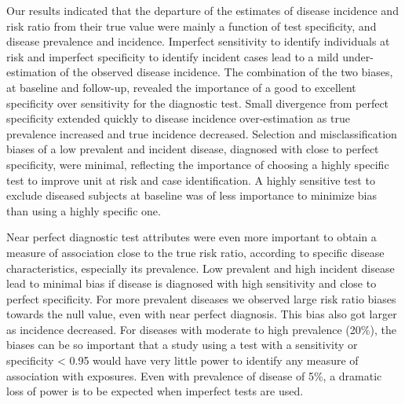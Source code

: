 Our results indicated that the departure of the estimates of disease incidence
and risk ratio from their true value were mainly a function of test specificity,
and disease prevalence and incidence.
Imperfect sensitivity to identify individuals at risk and imperfect
specificity to identify incident cases lead to a mild under-estimation of the
observed disease incidence.
The combination of the two biases, at baseline and follow-up, revealed the
importance of a good to excellent specificity over sensitivity for the
diagnostic test.
Small divergence from perfect specificity extended quickly to disease
incidence over-estimation as true prevalence increased and true incidence
decreased.
Selection and misclassification biases of a low prevalent and incident
disease, diagnosed with close to perfect specificity, were minimal, reflecting
the importance of choosing a highly specific test to improve unit at risk and
case identification.
A highly sensitive test to exclude diseased subjects at baseline was of less
importance to minimize bias than using a highly specific one.

Near perfect diagnostic test attributes were even more important to obtain a
measure of association close to the true risk ratio, according to specific
disease characteristics, especially its prevalence.
Low prevalent and high incident disease lead to minimal bias if disease is
diagnosed with high sensitivity and close to perfect specificity.
For more prevalent diseases we observed large risk ratio biases towards the
null value, even with near perfect diagnosis.
This bias also got larger as incidence decreased.
For diseases with moderate to high prevalence (20\%), the biases can be so
important that a study using a test with a sensitivity or specificity < 0.95
would have very little power to identify any measure of association with
exposures.
Even with prevalence of disease of 5\%, a dramatic loss of power is to be
expected when imperfect tests are used.

